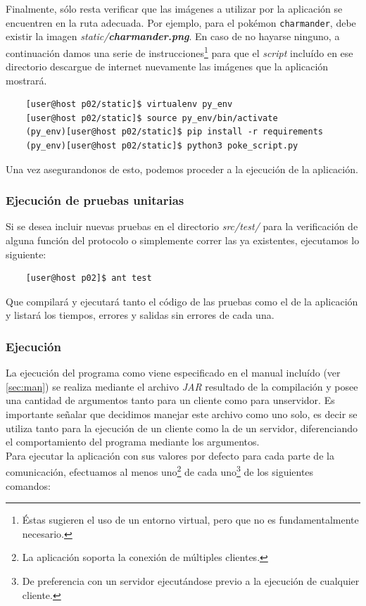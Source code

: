 \documentclass[12pt]{article}
\begin{document}
Finalmente, sólo resta verificar que las imágenes a utilizar por la aplicación se encuentren en la ruta adecuada. Por ejemplo, para el pokémon \texttt{charmander}, debe existir la imagen \textit{static/\textbf{charmander.png}}. En caso de no hayarse ninguno, a continuación damos una serie de instrucciones\footnote{Éstas sugieren el uso de un entorno virtual, pero que no es fundamentalmente necesario.} para que el \textit{script} incluído en ese directorio descargue de internet nuevamente las imágenes que la aplicación mostrará.
\begin{verbatim}
    [user@host p02/static]$ virtualenv py_env
    [user@host p02/static]$ source py_env/bin/activate    
    (py_env)[user@host p02/static]$ pip install -r requirements
    (py_env)[user@host p02/static]$ python3 poke_script.py
\end{verbatim}

Una vez asegurandonos de esto, podemos proceder a la ejecución de la aplicación.

\subsubsection{Ejecución de pruebas unitarias}
Si se desea incluir nuevas pruebas en el directorio \textit{src/test/} para la verificación de alguna función del protocolo o simplemente correr las ya existentes, ejecutamos lo siguiente:
\begin{verbatim}
    [user@host p02]$ ant test
\end{verbatim}
Que compilará y ejecutará tanto el código de las pruebas como el de la aplicación y listará los tiempos, errores y salidas sin errores de cada una.
\subsubsection{Ejecución}\label{sec:exec}
La ejecución del programa como viene especificado en el manual incluído (ver \ref{sec:man}) se realiza mediante el archivo \textit{JAR} resultado de la compilación y posee una cantidad de argumentos tanto para un cliente como para unservidor. Es importante señalar que decidimos manejar este archivo como uno solo, es decir se utiliza tanto para la ejecución de un cliente como la de un servidor, diferenciando el comportamiento del programa mediante los argumentos. \\
Para ejecutar la aplicación con sus valores por defecto para cada parte de la comunicación, efectuamos al menos uno\footnote{La aplicación soporta la conexión de múltiples clientes.} de cada uno\footnote{De preferencia con un servidor ejecutándose previo a la ejecución de cualquier cliente.} de los siguientes comandos:\\
\end{document}
